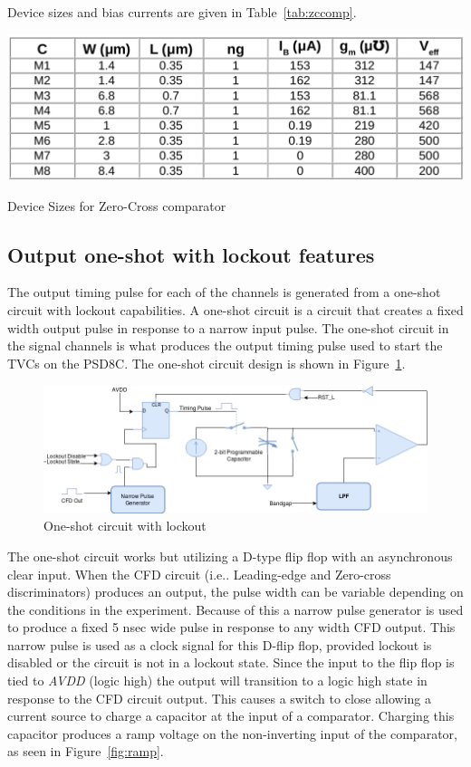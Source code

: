 \documentclass[12pt,oneside,final]{siuethesis}
\theoremstyle{definition}
\begin{document}
Device sizes and bias currents are given in Table~\ref{tab:zccomp}.

 \begin{table}[htbp!]
 \centering
 \includegraphics[scale=.35,keepaspectratio=true]{./ch3_figures/zc_cmp_sizes.png}
 \caption{Device Sizes for Zero-Cross comparator}
 \label{tab:zccomp}
\end{table}

\subsection{Output one-shot with lockout features}
\par The output timing pulse for each of the channels is generated from a one-shot circuit with lockout capabilities. A one-shot circuit is a circuit that creates a fixed width output pulse in response to a narrow input pulse. The one-shot circuit in the signal channels is what produces the output timing pulse used to start the TVCs on the PSD8C. The one-shot circuit design is shown in Figure~\ref{fig:oneshot-circuit}.

\begin{figure}[htbp!]
\centering
\includegraphics[scale=.50,keepaspectratio=true]{./ch3_figures/oneshot_circuit.png} 
\caption{One-shot circuit with lockout}
\label{fig:oneshot-circuit}
\end{figure}

\par The one-shot circuit works but utilizing a D-type flip flop with an asynchronous clear input. When the CFD circuit (i.e.. Leading-edge and Zero-cross discriminators) produces an output, the pulse width can be variable depending on the conditions in the experiment. Because of this a narrow pulse generator is used to produce a fixed 5 nsec wide pulse in response to any width CFD output. This narrow pulse is used as a clock signal for this D-flip flop, provided lockout is disabled or the circuit is not in a lockout state. Since the input to the flip flop is tied to \emph{AVDD} (logic high) the output will transition to a logic high state in response to the CFD circuit output. This causes a switch to close allowing a current source to charge a capacitor at the input of a comparator. Charging this capacitor produces a ramp voltage on the non-inverting input of the comparator, as seen in Figure~\ref{fig:ramp}.
\end{document}
